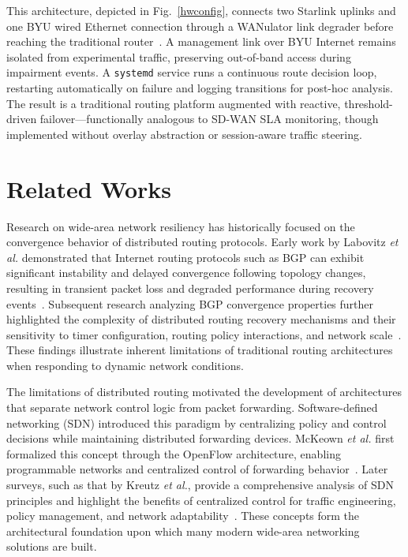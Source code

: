 \documentclass[conference]{IEEEtran}
\begin{document}
This architecture, depicted in Fig.~\ref{hwconfig}, connects two 
Starlink uplinks and one BYU wired Ethernet connection through a 
WANulator link degrader before reaching the traditional router~\cite{wanulator_home}. 
A management link over BYU Internet remains isolated from experimental 
traffic, preserving out-of-band access during impairment events. A 
\texttt{systemd} service runs a continuous route decision loop, 
restarting automatically on failure and logging transitions for post-hoc 
analysis. The result is a traditional routing platform augmented with 
reactive, threshold-driven failover---functionally analogous to SD-WAN 
SLA monitoring, though implemented without overlay abstraction or 
session-aware traffic steering.

\section{Related Works}

Research on wide-area network resiliency has historically focused on the convergence behavior of distributed routing protocols. Early work by Labovitz \textit{et al.} demonstrated that Internet routing protocols such as BGP can exhibit significant instability and delayed convergence following topology changes, resulting in transient packet loss and degraded performance during recovery events~\cite{labovitz2000}. Subsequent research analyzing BGP convergence properties further highlighted the complexity of distributed routing recovery mechanisms and their sensitivity to timer configuration, routing policy interactions, and network scale~\cite{griffin2002}. These findings illustrate inherent limitations of traditional routing architectures when responding to dynamic network conditions.

The limitations of distributed routing motivated the development of architectures that separate network control logic from packet forwarding. Software-defined networking (SDN) introduced this paradigm by centralizing policy and control decisions while maintaining distributed forwarding devices. McKeown \textit{et al.} first formalized this concept through the OpenFlow architecture, enabling programmable networks and centralized control of forwarding behavior~\cite{mckeown2008}. Later surveys, such as that by Kreutz \textit{et al.}, provide a comprehensive analysis of SDN principles and highlight the benefits of centralized control for traffic engineering, policy management, and network adaptability~\cite{kreutz2015}. These concepts form the architectural foundation upon which many modern wide-area networking solutions are built.
\end{document}
